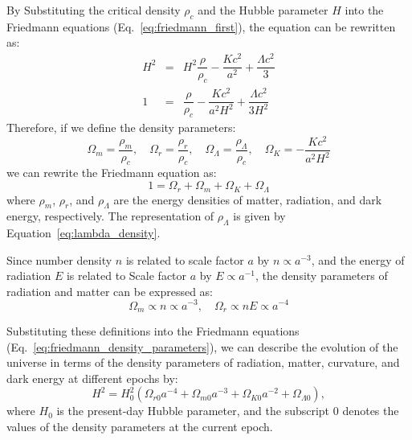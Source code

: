 By Substituting the critical density \( \rho_c \) and the Hubble parameter \( H \) into the Friedmann equations (Eq.~\eqref{eq:friedmann_first}), the equation can be rewritten as:    
\begin{eqnarray}
    H^2 &=& H^2\dfrac{\rho}{\rho_c} - \dfrac{Kc^2}{a^2} + \dfrac{\Lambda c^2}{3} \nonumber \\[2ex]
    1 &=& \dfrac{\rho}{\rho_c} - \dfrac{Kc^2}{a^2 H^2} + \dfrac{\Lambda c^2}{3H^2} \label{eq:friedmann_rewritten}
\end{eqnarray}
Therefore, if we define the density parameters:
\begin{equation}
    \label{eq:density_parameters}
    \Omega_m = \dfrac{\rho_m}{\rho_c}, \quad \Omega_r = \dfrac{\rho_r}{\rho_c}, \quad \Omega_{\Lambda} = \dfrac{\rho_{\Lambda}}{\rho_c}, \quad \Omega_K = -\dfrac{Kc^2}{a^2 H^2}
\end{equation}
we can rewrite the Friedmann equation as:
\begin{equation}
    \label{eq:friedmann_density_parameters}
    1 = \Omega_r  + \Omega_m  + \Omega_K  + \Omega_{\Lambda}
\end{equation}
where $\rho_m$, $\rho_r$, and $\rho_{\Lambda}$ are the energy densities of matter, radiation, and dark energy, respectively. The representation of $\rho_\Lambda$ is given by Equation~\eqref{eq:lambda_density}.

Since number density \( n \) is related to scale factor \( a \) by \( n \propto a^{-3} \), and the energy of radiation \( E \) is related to Scale factor \( a \) by \( E \propto a^{-1} \), the density parameters of radiation and matter can be expressed as:
\begin{equation}
    \label{eq:density_parameters_radiation_matter}
    \Omega_m \propto n \propto a^{-3}, \quad \Omega_r \propto nE \propto a^{-4}
\end{equation}

Substituting these definitions into the Friedmann equations (Eq.~\eqref{eq:friedmann_density_parameters}), we can describe the evolution of the universe in terms of the density parameters of radiation, matter, curvature, and dark energy at different epochs by:
\begin{equation}
    H^2 = H_0^2 \left( \Omega_{r0} a^{-4} + \Omega_{m0} a^{-3} + \Omega_{K0} a^{-2} + \Omega_{\Lambda0} \right),
    \label{eq:friedmann_rewritten}
\end{equation}
where \( H_0 \) is the present-day Hubble parameter, and the subscript \( 0 \) denotes the values of the density parameters at the current epoch. 

